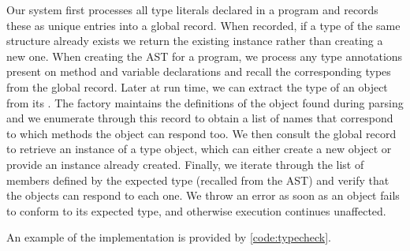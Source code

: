 Our system first processes all type literals declared in a program and records these as
unique entries into a global record.
When recorded, if a type of the same structure already exists we return the existing instance
rather than creating a new one.
When creating the AST for a program, 
we process any type annotations present on method and variable declarations and
recall the corresponding types from the global record. 
Later at run time, we can extract the type of an object from its .
The factory maintains the definitions of the object found during parsing and
we enumerate through this record to obtain a list of names that correspond
to which methods the object can respond too.
We then consult the global record to retrieve an instance of a type object,
which can either create a new object or provide an instance already created.
Finally, we iterate through the list of members defined by the expected type 
(recalled from the AST) and verify that the objects can respond to each one.
We throw an error as soon as an object fails to conform to its expected type, 
and otherwise execution continues unaffected.

An example of the implementation is provided by \cref{code:typecheck}.








